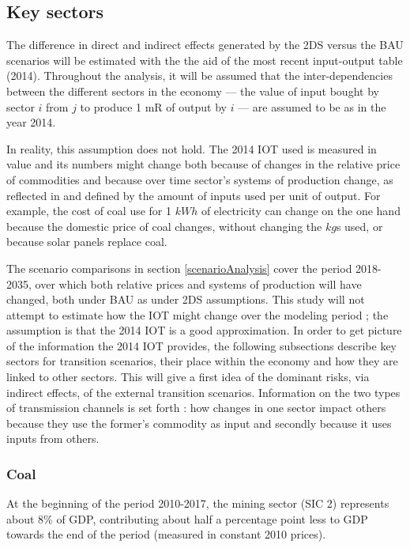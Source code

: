\documentclass[12pt,english]{article}
\begin{document}
\clearpage

\subsection{Key sectors}
The difference in direct and indirect effects generated by the 2DS versus the BAU scenarios will be estimated with the the aid of the most recent input-output table (2014). Throughout the analysis, it will be assumed that the inter-dependencies between the different sectors in the economy --- the value of input bought by sector $i$ from $j$ to produce 1 mR of output by $i$ --- are assumed to be as in the year 2014. %

In reality, this assumption does not hold. The 2014 IOT used is measured in value and its numbers might change both because of changes in the relative price of commodities and because over time sector's systems of production change, as reflected in and defined by the amount of inputs used per unit of output. For example, the cost of coal use for 1 $kWh$ of electricity can change on the one hand because the domestic price of coal changes, without changing the $kg$s used, or because solar panels replace coal.

The scenario comparisons in section \ref{scenarioAnalysis} cover the period 2018-2035, over which both relative prices and systems of production will have changed, both under BAU as under 2DS assumptions. This study will not attempt to estimate how the IOT might change over the modeling period ; the assumption is that the 2014 IOT is a good approximation. In order to get picture of the information the 2014 IOT provides, the following subsections describe key sectors for transition scenarios, their place within the economy and how they are linked to other sectors. This will give a first idea of the dominant risks, via indirect effects, of the external transition scenarios. Information on the two types of transmission channels is set forth : how changes in one sector impact others because they use the former's commodity as input and secondly because it uses inputs from others. 


\subsubsection{Coal}
At the beginning of the period 2010-2017, the mining sector (SIC 2) represents about 8\% of GDP, contributing about half a percentage point less to GDP towards the end of the period \citep{P0441StatSA2018Q2} (measured in constant 2010 prices). 
\end{document}
